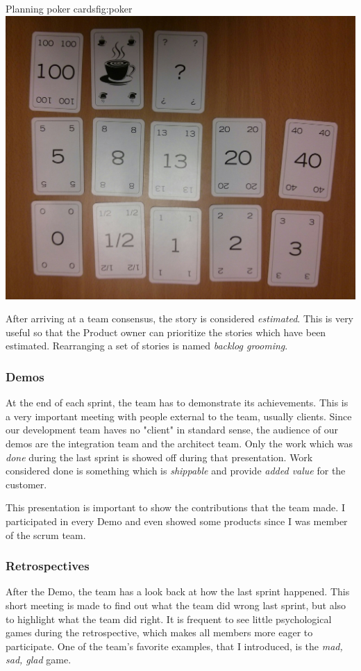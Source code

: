 \begin{figureGraphics}{Planning poker cards}{fig:poker}
    \includegraphics[width=\textwidth]{./src/img/poker.jpg}
\end{figureGraphics}

After arriving at a team consensus, the story is considered \emph{estimated}. This
is very useful so that the Product owner can prioritize the stories which have
been estimated. Rearranging a set of stories is named \emph{backlog grooming}.


\subsubsection{Demos}
At the end of each sprint, the team has to demonstrate its achievements. This
is a very important meeting with people external to the team, usually clients.
Since our development team haves no "client" in standard sense, the audience of our demos are
the integration team and the architect team.
Only the work which was \emph{done} during the last sprint is showed off during that presentation.
Work considered done is something which is \emph{shippable} and provide \emph{added value} for the customer.

This presentation is important to show the contributions that the team made.
I participated in every Demo and even showed some products since I was member of the \gls{scrum} team.

\subsubsection{Retrospectives}
After the Demo, the team has a look back at how the last sprint happened. This short meeting is made
to find out what the team did wrong last sprint, but also to highlight what the team did right.
It is frequent to see little psychological games during the retrospective, which makes all members more
eager to participate. One of the team's favorite examples, that I introduced, is the \emph{mad, sad, glad} game.

